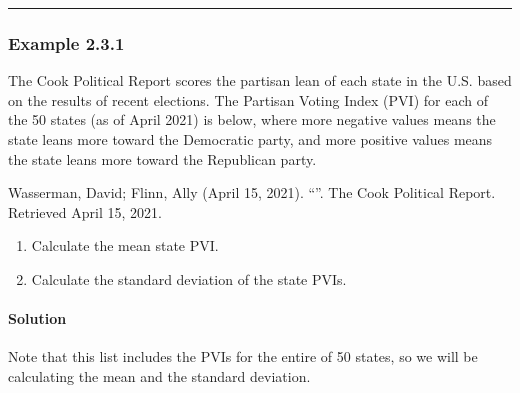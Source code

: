 \documentclass[letterpaper,10pt,english]{jupyterBook}
\begin{document}
\bigskip\hrule\bigskip



\subsubsection{Example 2.3.1}
\label{\detokenize{Ch2 Descriptive Statistics/2.3 Measures of Dispersion:example-2-3-1}}
\sphinxAtStartPar
The Cook Political Report scores the partisan lean of each state in the U.S. based on the results of recent elections. The Partisan Voting Index (PVI) for each of the 50 states (as of April 2021) is below, where more negative values means the state leans more toward the Democratic party, and more positive values means the state leans more toward the Republican party.%
\begin{footnote}[1]\sphinxAtStartFootnote
Wasserman, David; Flinn, Ally (April 15, 2021). “”. The Cook Political Report. Retrieved April 15, 2021.
%
\end{footnote}


\begin{enumerate}
%
\item {} 
\sphinxAtStartPar
Calculate the mean state PVI.

\item {} 
\sphinxAtStartPar
Calculate the standard deviation of the state PVIs.

\end{enumerate}


\paragraph{Solution}
\label{\detokenize{Ch2 Descriptive Statistics/2.3 Measures of Dispersion:solution}}
\sphinxAtStartPar
Note that this list includes the PVIs for the entire  of 50 states, so we will be calculating the  mean and the  standard deviation.
\end{document}
